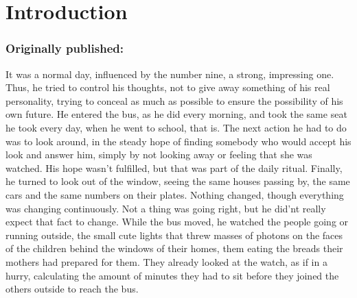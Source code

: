 \mainmatter
\chapter{Introduction}
\label{cha:introduction}
\subsection*{Originally published: }
It was a normal day, influenced by the number nine, a strong, impressing one. Thus, he tried to control his thoughts, not to give away something of his real personality, trying to conceal as much as possible to ensure the possibility of his own future. He entered the bus, as he did every morning, and took the same seat he took every day, when he went to school, that is. The next action he had to do was to look around, in the steady hope of finding somebody who would accept his look and answer him, simply by not looking away or feeling that she was watched. His hope wasn't fulfilled, but that was part of the daily ritual. Finally, he turned to look out of the window, seeing the same houses passing by, the same cars and the same numbers on their plates. Nothing changed, though everything was changing continuously. Not a thing was going right, but he did'nt really expect that fact to change. While the bus moved, he watched the people going or running outside, the small cute lights that threw masses of photons on the faces of the children behind the windows of their homes, them eating the breads their mothers had prepared for them. They already looked at the watch, as if in a hurry, calculating the amount of minutes they had to sit before they joined the others outside to reach the bus.

